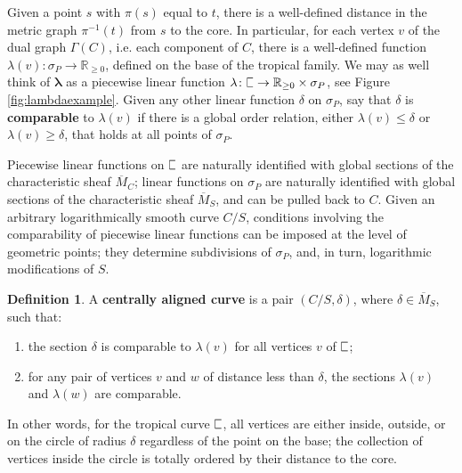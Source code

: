 \documentclass[11pt]{amsart}
\newcommand{\plC}{\scalebox{0.8}[1.3]{$\sqsubset$}}
\newcommand{\sqC}{\scalebox{0.8}[1.3]{$\sqsubset$}}
\renewcommand{\to}{\rightarrow}
\newcommand{\RR}{\mathbb{R}}
\theoremstyle{definition}
\theoremstyle{definition}
\newtheorem{definition}[thm]{Definition}
\begin{document}
Given a point $s$ with $\pi(s)$ equal to $t$, there is a well-defined distance in the metric graph $\pi^{-1}(t)$ from $s$ to the core. 
In particular, for each vertex $v$ of the dual graph $\Gamma(C)$, i.e. each component of $C$, there is a well-defined function $\lambda(v): \sigma_P\to \RR_{\geq 0}$, defined on the base of the tropical family. We may as well think of $\boldsymbol{\lambda}$ as a piecewise linear function $\lambda\colon\plC\to\RR_{\geq 0}\times\sigma_P$, see Figure \ref{fig:lambdaexample}. Given any other linear function $\delta$ on $\sigma_P$, say that $\delta$ is \textbf{comparable} to $\lambda(v)$ if there is a global order relation, either $\lambda(v)\leq \delta$ or $\lambda(v)\geq \delta$, that holds at all points of $\sigma_P$. 

Piecewise linear functions on $\plC$ are naturally identified with global sections of the characteristic sheaf $\overline M_C$; linear functions on $\sigma_P$ are naturally identified with global sections of the characteristic sheaf $\overline M_S$, and can be pulled back to $C$. Given an arbitrary logarithmically smooth curve $C/S$, conditions involving the comparability of piecewise linear functions can be imposed at the level of geometric points; they determine subdivisions of $\sigma_P$, and, in turn, logarithmic modifications of $S$. %

\begin{definition}
A \textbf{centrally aligned curve} is a pair $(C/S,\delta)$, where $\delta\in\overline{M}_S$, such that:
\begin{enumerate}
    \item the section $\delta$ is comparable to $\lambda(v)$ for all vertices $v$ of $\plC$;
    \item for any pair of vertices $v$ and $w$ of distance less than $\delta$, the sections $\lambda(v)$ and $\lambda(w)$ are comparable.
\end{enumerate}
\end{definition}
In other words, for the tropical curve $\sqC$, all vertices are either inside, outside, or on the circle of radius $\delta$ regardless of the point on the base; the collection of vertices inside the circle is totally ordered by their distance to the core.
\end{document}
